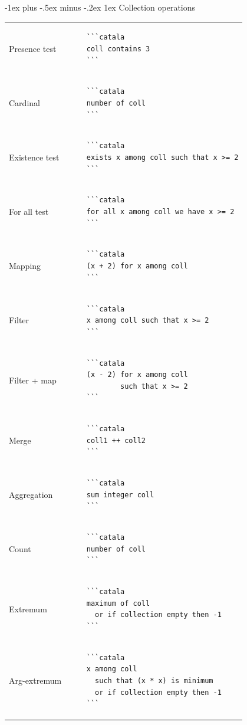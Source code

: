 \documentclass{article}
\makeatletter
\newcommand\articlenormalsize{\fontsize{10pt}{12pt}\selectfont}
\renewcommand{\section}{\@startsection{section}{1}{0mm}%
                                {-1ex plus -.5ex minus -.2ex}%
                                {1ex}%
                                {\normalfont\articlenormalsize\bfseries}}
\newenvironment{catala}{%
  \VerbatimEnvironment
  \let\FV@ListVSpace\relax
  \begin{verbatim}}%
 {\end{verbatim}}
\makeatother
\begin{document}
\begin{multicols}{3}
\section{Collection operations}

\begin{tabular}{@{}p{\cola}p{\colb}@{}}
  
  Presence test & \begin{catala}
    ```catala
    coll contains 3
    ```
  \end{catala}
  \\
  Cardinal & \begin{catala}
    ```catala
    number of coll
    ```
  \end{catala}
  \\
  Existence test & \begin{catala}
    ```catala
    exists x among coll such that x >= 2
    ```
  \end{catala}
  \\
  For all test & \begin{catala}
    ```catala
    for all x among coll we have x >= 2
    ```
  \end{catala}
  \\
  Mapping & \begin{catala}
    ```catala
    (x + 2) for x among coll
    ```
  \end{catala}
  \\
  Filter & \begin{catala}
    ```catala
    x among coll such that x >= 2
    ```
  \end{catala}
  \\
  Filter + map & \begin{catala}
    ```catala
    (x - 2) for x among coll
            such that x >= 2
    ```
  \end{catala}
  \\
  Merge & \begin{catala}
    ```catala
    coll1 ++ coll2
    ```
  \end{catala}
  \\
  Aggregation & \begin{catala}
    ```catala
    sum integer coll
    ```
  \end{catala}
  \\
  Count & \begin{catala}
    ```catala
    number of coll
    ```
  \end{catala}
  \\
  Extremum & \begin{catala}
    ```catala
    maximum of coll
      or if collection empty then -1
    ```
  \end{catala}
  \\
  Arg-extremum & \begin{catala}
    ```catala
    x among coll
      such that (x * x) is minimum
      or if collection empty then -1
    ```
  \end{catala}
  \\
\end{tabular}

\end{multicols}
\end{document}
